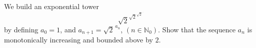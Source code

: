 We build an exponential tower
\[ \sqrt{2}^{\sqrt{2}^{\sqrt{2}^{\cdot^{\cdot^{\cdot}}}}} \]
by defining $a_0 = 1$, and $a_{n+1} = \sqrt{2}^{\,a_n}$, $(n \in \mathbb{N}_0)$. Show that the sequence $a_n$ is monotonically increasing and bounded above by $2$.

